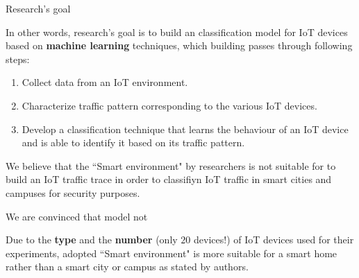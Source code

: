 \documentclass[10pt]{beamer}
\begin{document}
\begin{frame}{Research's goal}

In other words, research's goal is to build an classification model for IoT devices based on \textbf{machine learning} techniques, which building passes through following steps:

\begin{enumerate}
\item Collect data from an IoT environment.
\item Characterize traffic pattern corresponding to the various IoT devices.
\item Develop a classification technique that learns the behaviour of an IoT device and is able to identify it based on its traffic pattern.
\end{enumerate}



We believe that the ``Smart environment" by researchers is not suitable for to build an IoT traffic trace in order to classifiyn IoT traffic in smart cities and campuses for security purposes.

We are convinced that model not 

Due to the \textbf{type} and the \textbf{number} (only $20$ devices!) of IoT devices used for their experiments, adopted ``Smart environment" is more suitable for a smart home rather than a smart city or campus as stated by authors.




\end{frame} 
\end{document}
